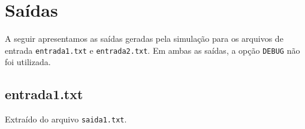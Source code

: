 \documentclass[12pt]{article}
\begin{document}

\section{Saídas}

A seguir apresentamos as saídas geradas pela simulação para os arquivos de entrada 
\verb|entrada1.txt| e \verb|entrada2.txt|. Em ambas as saídas, a opção \verb|DEBUG| não foi 
utilizada.

\subsection{entrada1.txt}

Extraído do arquivo \verb|saida1.txt|.
\end{document}
